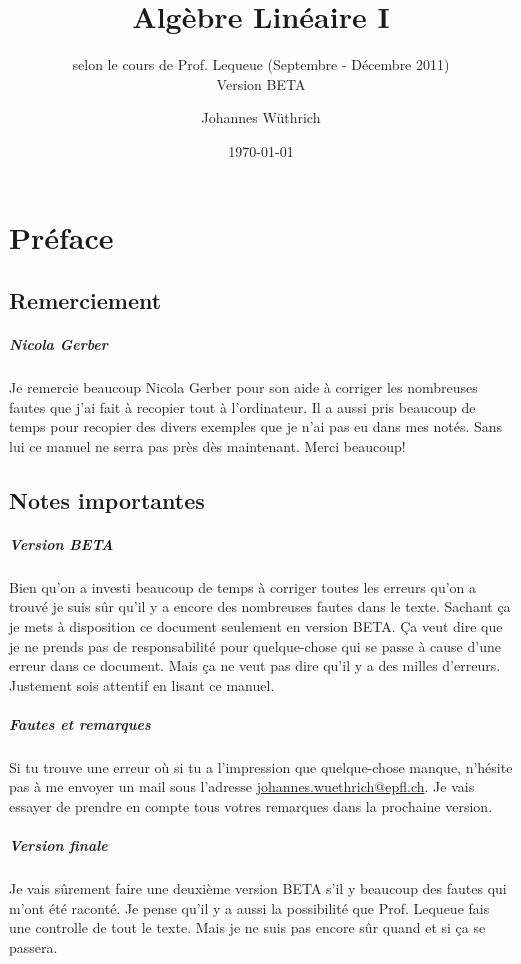 \documentclass[10pt,a4paper]{scrreprt}
\title{Algèbre Linéaire I}
\subtitle{selon le cours de Prof. Lequeue (Septembre - Décembre 2011) \\ Version BETA}
\author{Johannes Wüthrich}
\date{\today}
\begin{document}
\maketitle

\setcounter{chapter}{-1}

\chapter{Préface}
%
\section{Remerciement}
%
\paragraph{Nicola Gerber} Je remercie beaucoup Nicola Gerber pour son aide à corriger les nombreuses fautes que j'ai fait à recopier tout à l'ordinateur. Il a aussi pris beaucoup de temps pour recopier des divers exemples que je n'ai pas eu dans mes notés. Sans lui ce manuel ne serra pas près dès maintenant. Merci beaucoup!

%
\section{Notes importantes}
%
\paragraph{Version BETA} Bien qu'on a investi beaucoup de temps à corriger toutes les erreurs qu'on a trouvé je suis sûr qu'il y a encore des nombreuses fautes dans le texte. Sachant ça je mets à disposition ce document seulement en version BETA. Ça veut dire que je ne prends pas de responsabilité pour quelque-chose qui se passe à cause d'une erreur dans ce document. Mais ça ne veut pas dire qu'il y a des milles d'erreurs. Justement sois attentif en lisant ce manuel.

\paragraph{Fautes et remarques} Si tu trouve une erreur où si tu a l'impression que quelque-chose manque, n'hésite pas à me envoyer un mail sous l'adresse \href{mailto:johannes.wuethrich@epfl.ch}{johannes.wuethrich@epfl.ch}. Je vais essayer de prendre en compte tous votres remarques dans la prochaine version.

\paragraph{Version finale} Je vais sûrement faire une deuxième version BETA s'il y beaucoup des fautes qui m'ont été raconté. Je pense qu'il y a aussi la possibilité que Prof. Lequeue fais une controlle de tout le texte. Mais je ne suis pas encore sûr quand et si ça se passera. 

\tableofcontents













\end{document}
